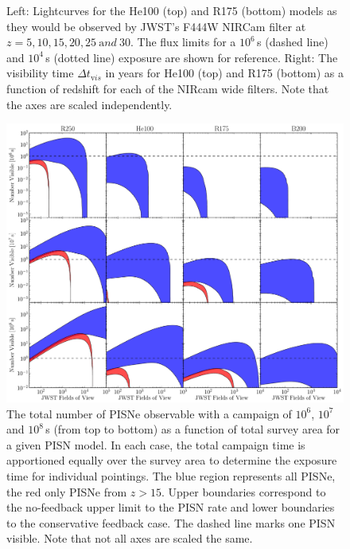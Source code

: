 \documentclass{thesis}
\begin{document}
\begin{appendix}
\begin{figure}
\begin{center}
{\begin{picture}
              \end{picture}}
              \caption{Left: Lightcurves for the
                \citet{KasenWoosleyHeger2011} He100 (top) and R175
                (bottom) models as they would be observed by JWST's
                F444W NIRCam filter at $z = 5, 10, 15, 20, 25 \:{\mathrm
                  and}\: 30$. The flux limits for a $10^6\,$s (dashed
                line) and $10^4\,$s (dotted line) exposure are shown
                for reference.  Right: The visibility time $\Delta
                t_{\mathrm vis}$ in years for He100 (top) and R175
                (bottom) as a function of redshift for each of the
                NIRcam wide filters. Note that the axes are scaled
                independently.}
              \label{visibility2}
  \end{center}
  \vspace*{\fill}
\end{figure}

\begin{figure}
  \vspace*{\fill}
  \begin{center}
    \includegraphics[width=\textwidth]{area_observability}
    \caption{The total number of PISNe observable with a
      campaign of $10^6$, $10^7$ and $10^8\,$s (from top to bottom) as
      a function of total survey area for a given PISN model.  In each
      case, the total campaign time is apportioned equally over the
      survey area to determine the exposure time for individual
      pointings.  The blue region represents all PISNe, the red only
      PISNe from $z>15$.  Upper boundaries correspond to the
      no-feedback upper limit to the PISN rate and lower boundaries to
      the conservative feedback case.  The dashed line marks one PISN
      visible. Note that not all axes are scaled the same.  }
    \label{area_obs}
  \end{center}
  \vspace*{\fill}
\end{figure} 
\end{appendix}
\end{document}

